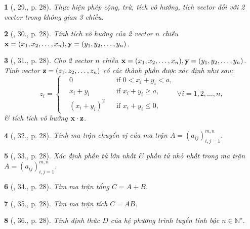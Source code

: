 \documentclass{article}
\newtheorem{baitoan}{}
\begin{document}
\begin{baitoan}[\cite{Doanh_Tuan_Pascal}, 29., p. 28]
	Thực hiện phép cộng, trừ, tích vô hướng, tích vector đối với 2 vector trong không gian 3 chiều.
\end{baitoan}

\begin{baitoan}[\cite{Doanh_Tuan_Pascal}, 30., p. 28]
	Tính tích vô hướng của 2 vector $n$ chiều ${\bf x} = (x_1,x_2,\ldots,x_n),{\bf y} = (y_1,y_2,\ldots,y_n)$.
\end{baitoan}

\begin{baitoan}[\cite{Doanh_Tuan_Pascal}, 31., p. 28]
	Cho 2 vector $n$ chiều ${\bf x} = (x_1,x_2,\ldots,x_n),{\bf y} = (y_1,y_2,\ldots,y_n)$. Tính vector ${\bf z} = (z_1,z_2,\ldots,z_n)$ có các thành phần được xác định như sau:
	\begin{equation*}
		z_i = \left\{\begin{split}
			&0&&\mbox{if } 0 < x_i + y_i < a,\\
			&x_i + y_i&&\mbox{if } x_i + y_i\ge a,\\
			&(x_i + y_i)^2&&\mbox{if } x_i + y_i\le0,
		\end{split}\right.\ \forall i = 1,2,\ldots,n,
	\end{equation*}
	\& tích tích vô hướng ${\bf x}\cdot{\bf z}$.
\end{baitoan}

\begin{baitoan}[\cite{Doanh_Tuan_Pascal}, 32., p. 28]
	Tính ma trận chuyển vị của ma trận $A = (a_{ij})_{i,j=1}^{m,n}$.
\end{baitoan}

\begin{baitoan}[\cite{Doanh_Tuan_Pascal}, 33., p. 28]
	Xác định phần tử lớn nhất \& phần tử nhỏ nhất trong ma trận $A = (a_{ij})_{i,j=1}^{m,n}$.
\end{baitoan}

\begin{baitoan}[\cite{Doanh_Tuan_Pascal}, 34., p. 28]
	Tìm ma trận tổng $C = A + B$.
\end{baitoan}

\begin{baitoan}[\cite{Doanh_Tuan_Pascal}, 35., p. 28]
	Tìm ma trận tích $C = AB$.
\end{baitoan}

\begin{baitoan}[\cite{Doanh_Tuan_Pascal}, 36., p. 28]
	Tính định thức $D$ của hệ phương trình tuyến tính bậc $n\in\mathbb{N}^\star$.
\end{baitoan}
\end{document}
